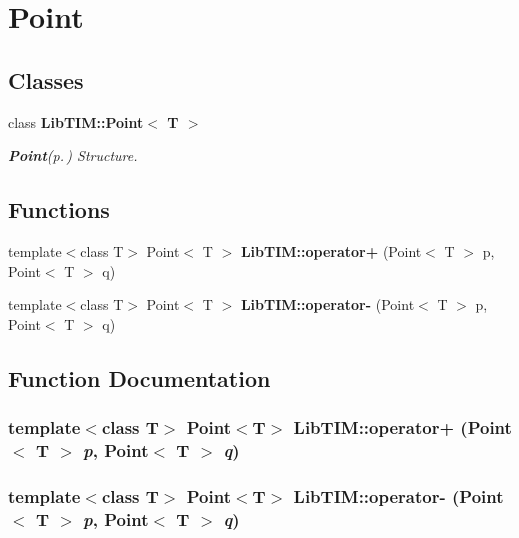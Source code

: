 \section{Point}
\label{group__Point}
\subsection*{Classes}
\begin{CompactItemize}
\item 
class {\bf Lib\-TIM::Point$<$ T $>$}
\begin{CompactList}\small\item\em {\bf Point}{\rm (p.\,\pageref{classLibTIM_1_1Point})} Structure. \item\end{CompactList}\end{CompactItemize}
\subsection*{Functions}
\begin{CompactItemize}
\item 
template$<$class T$>$ Point$<$ T $>$ {\bf Lib\-TIM::operator+} (Point$<$ T $>$ p, Point$<$ T $>$ q)
\item 
template$<$class T$>$ Point$<$ T $>$ {\bf Lib\-TIM::operator-} (Point$<$ T $>$ p, Point$<$ T $>$ q)
\end{CompactItemize}


\subsection{Function Documentation}
\subsubsection{\setlength{\rightskip}{0pt plus 5cm}template$<$class T$>$ Point$<$T$>$ Lib\-TIM::operator+ (Point$<$ T $>$ {\em p}, Point$<$ T $>$ {\em q})}\label{group__Point_ga0}


\subsubsection{\setlength{\rightskip}{0pt plus 5cm}template$<$class T$>$ Point$<$T$>$ Lib\-TIM::operator- (Point$<$ T $>$ {\em p}, Point$<$ T $>$ {\em q})}\label{group__Point_ga1}


